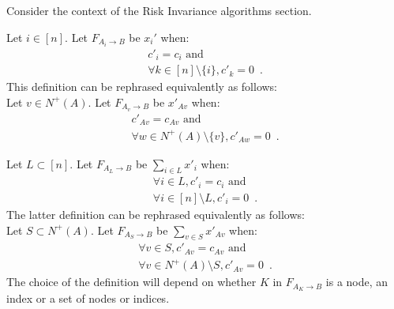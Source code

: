 \begin{definition}

  Consider the context of the Risk Invariance algorithms section.

  Let $i \in [n]$. Let $F_{A_i \rightarrow B}$ be $x_i'$ when:
  \begin{equation*}
  \begin{gathered}
    c'_i = c_i \mbox{ and} \\
    \forall k \in [n] \setminus \{i\}, c'_k = 0 \enspace.
  \end{gathered}
  \end{equation*}
  This definition can be rephrased equivalently as follows: \\
  Let $v \in N^{+}\left(A\right)$. Let $F_{A_v \rightarrow B}$ be $x'_{Av}$ when:
  \begin{equation*}
  \begin{gathered}
    c'_{Av} = c_{Av} \mbox{ and} \\
    \forall w \in N^{+}\left(A\right) \setminus \{v\}, c'_{Aw} = 0 \enspace.
  \end{gathered}
  \end{equation*}

  Let $L \subset [n]$. Let $F_{A_L \rightarrow B}$ be $\sum\limits_{i \in L}x'_i$ when:
  \begin{equation*}
  \begin{gathered}
    \forall i \in L, c'_i = c_i \mbox{ and} \\ 
    \forall i \in [n] \setminus L, c'_i = 0 \enspace.
  \end{gathered}
  \end{equation*} 
  The latter definition can be rephrased equivalently as follows: \\
  Let $S \subset N^{+}\left(A\right)$. Let $F_{A_S \rightarrow B}$ be
  $\sum\limits_{v \in S}x'_{Av}$ when:
  \begin{equation*}
  \begin{gathered}
    \forall v \in S, c'_{Av} = c_{Av} \mbox{ and} \\
    \forall v \in N^{+}\left(A\right) \setminus S, c'_{Av} = 0 \enspace.
  \end{gathered}
  \end{equation*}
  The choice of the definition will depend on whether $K$ in $F_{A_K \rightarrow B}$ is a node, an index or a set of nodes
  or indices.
\end{definition}
